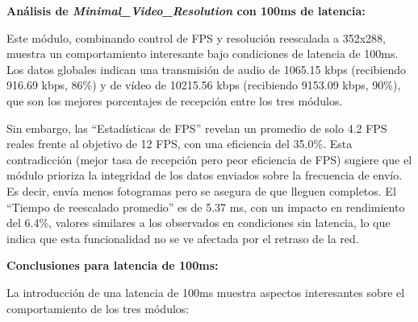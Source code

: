 \vspace{\baselineskip}

\textbf{Análisis de \textit{Minimal\_Video\_Resolution} con 100ms de latencia:}
\vspace{\baselineskip}

Este módulo, combinando control de FPS y resolución reescalada a 352x288, muestra un comportamiento interesante bajo condiciones de latencia de 100ms. Los datos globales indican una transmisión de audio de 1065.15 kbps (recibiendo 916.69 kbps, 86\%) y de vídeo de 10215.56 kbps (recibiendo 9153.09 kbps, 90\%), que son los mejores porcentajes de recepción entre los tres módulos.
\vspace{\baselineskip}

Sin embargo, las ``Estadísticas de FPS'' revelan un promedio de solo 4.2 FPS reales frente al objetivo de 12 FPS, con una eficiencia del 35.0\%. Esta contradicción (mejor tasa de recepción pero peor eficiencia de FPS) sugiere que el módulo prioriza la integridad de los datos enviados sobre la frecuencia de envío. Es decir, envía menos fotogramas pero se asegura de que lleguen completos. El ``Tiempo de reescalado promedio'' es de 5.37 ms, con un impacto en rendimiento del 6.4\%, valores similares a los observados en condiciones sin latencia, lo que indica que esta funcionalidad no se ve afectada por el retraso de la red.
\vspace{\baselineskip}

\textbf{Conclusiones para latencia de 100ms:}

La introducción de una latencia de 100ms muestra aspectos interesantes sobre el comportamiento de los tres módulos:

